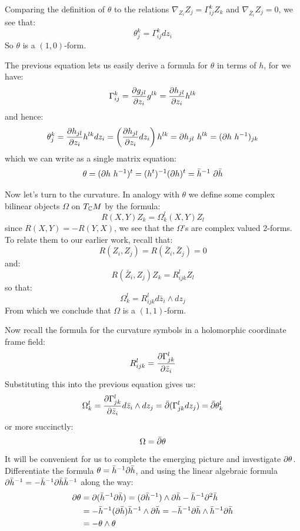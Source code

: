 Comparing the definition of $\theta$ to the relations $ \nabla_{Z_i} Z_j = \Gamma_{ij}^k Z_k $ and $\nabla_{\bar{Z}_i} Z_j = 0$, we see that:
%
$$ \theta^k_j = \Gamma_{ij}^k d z_i $$
%
So $\theta$ is a $(1,0)$-form.

The previous equation lets us easily derive a formula for $\theta$ in terms of $h$, for we have:
%
$$ \Gamma_{ij}^k = \frac{ \partial g_{jl} }{ \partial z_i } g^{lk} = \frac{ \partial h_{jl} }{ \partial z_i } h^{lk} $$
%
and hence:
%
$$ \theta^k_j = \frac{ \partial h_{jl} }{ \partial z_i } h^{lk} d z_i = \left( \frac{ \partial h_{jl} }{ \partial z_i } d z_i \right) h^{lk} = \partial h_{jl} \ h^{lk} = ( \partial h \ h^{-1} )_{jk} $$
%
which we can write as a single matrix equation:
%
$$ \theta = ( \partial h \ h^{-1} )^{t} = (h^t)^{-1} (\partial h)^{t} = \bar{h}^{-1} \ \partial \bar{h} $$

Now let's turn to the curvature.  In analogy with $\theta$ we define some complex bilinear objects $\Omega$ on $T_{\mathbb{C}}M$ by the formula:
%
$$ R( X, Y ) Z_k = \Omega_k^l (X, Y) Z_l $$
%
since $R(X,Y) = - R(Y,X)$, we see that the $\Omega$'s are complex valued 2-forms.  To relate them to our earlier work, recall that:
%
$$ R(Z_i, Z_j) = R( \bar{Z}_i, \bar{Z}_j ) = 0 $$
%
and:
%
$$ R( \bar{Z}_i, Z_j )Z_k = R_{ijk}^l Z_l $$
%
so that:
%
$$ \Omega_k^l = R_{ijk}^l d \bar{z}_i \wedge d z_j $$
%
From which we conclude that $\Omega$ is a $(1,1)$-form.

Now recall the formula for the curvature symbols in a holomorphic coordinate frame field:
%
$$ R_{ijk}^l = \frac{ \partial \Gamma_{jk}^l }{ \partial \bar{z}_i } $$
%
Substituting this into the previous equation gives us:
%
$$ \Omega_k^l = \frac{ \partial \Gamma_{jk}^l }{ \partial \bar{z}_i } d \bar{z}_i \wedge d z_j = \bar{\partial}( \Gamma_{jk}^l d z_j ) = \bar{\partial} \theta_k^l $$
%
or more succinctly:
%
$$ \Omega = \bar{\partial} \theta $$
%
It will be convenient for us to complete the emerging picture and investigate $ \partial \theta $.  Differentiate the formula $\theta = \bar{h}^{-1} \partial \bar{h}$, and using the linear algebraic formula $\partial \bar{h}^{-1} = - \bar{h}^{-1} \partial \bar{h} \bar{h}^{-1}$ along the way:
%
\begin{align*}
\partial \theta &= \partial(  \bar{h}^{-1} \partial \bar{h} ) = ( \partial \bar{h}^{-1} ) \wedge \partial \bar{h} - \bar{h}^{-1} \partial^2 \bar{h} \\
&= - \bar{h}^{-1} (\partial \bar{h}) \bar{h}^{-1} \wedge \partial \bar{h}  = - \bar{h}^{-1} \partial \bar{h} \wedge \bar{h}^{-1} \partial \bar{h} \\
&= - \theta \wedge \theta
\end{align*}

